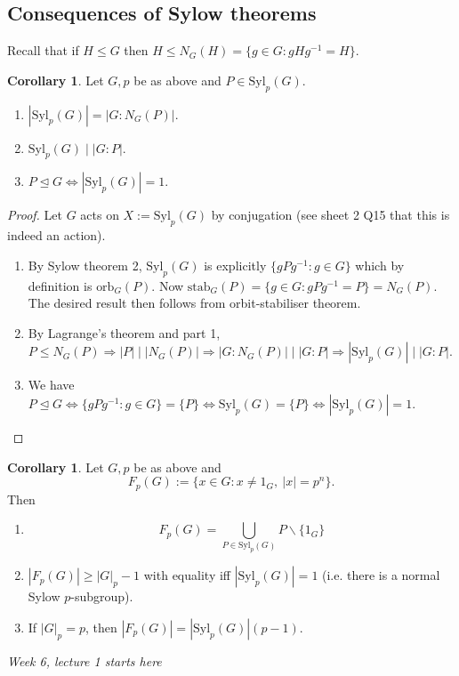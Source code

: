 \documentclass[a4paper]{article}
\newcommand{\Syl}{\text{Syl}}
\newcommand{\orb}{\text{orb}}
\newcommand{\stab}{\text{stab}}
\theoremstyle{definition}
\newtheorem{coro}[defn]{Corollary}
\begin{document}
\subsection{Consequences of Sylow theorems}
Recall that if $H\leq G$ then $H\leq N_G(H)=\{g\in G:gHg^{-1}=H\}$.

\begin{coro}
\label{coro:consequence1Sylow}
Let $G,p$ be as above and $P\in \Syl_p(G)$.
\begin{enumerate}
\item $|\Syl_p(G)|=|G:N_G(P)|$.
\item $\Syl_p(G)\mid |G:P|$.
\item $P\unlhd G\Leftrightarrow |\Syl_p(G)|=1$.
\end{enumerate}
\end{coro}
\begin{proof}
Let $G$ acts on $X:=\Syl_p(G)$ by conjugation (see sheet 2 Q15 that this is indeed an action).
\begin{enumerate}
\item By Sylow theorem 2, $\Syl_p(G)$ is explicitly $\{gPg^{-1}:g\in G\}$ which by definition is $\orb_G(P)$. Now $\stab_G(P)=\{g\in G:gPg^{-1}=P\}=N_G(P)$. The desired result then follows from orbit-stabiliser theorem.
\item By Lagrange's theorem and part 1, $P\leq N_G(P)\Rightarrow |P| \mid |N_G(P)| \Rightarrow |G:N_G(P)| \mid |G:P|\Rightarrow |\Syl_p(G)| \mid |G:P|$.
\item We have $P\unlhd G\Leftrightarrow \{gPg^{-1}:g\in G\}=\{P\}\Leftrightarrow \Syl_p(G)=\{P\}\Leftrightarrow |\Syl_p(G)|=1$.
\end{enumerate}
\end{proof}

\begin{coro}
\label{coro:consequence2Sylow}
Let $G,p$ be as above and
\[
F_p(G):=\{x\in G:x\neq 1_G,\ |x|=p^n\}.
\]
Then
\begin{enumerate}
\item \[
F_p(G)=\bigcup_{P\in\Syl_p(G)} P\backslash \{1_G\}
\]
\item $|F_p(G)|\geq |G|_p-1$ with equality iff $|\Syl_p(G)|=1$ (i.e. there is a normal Sylow $p$-subgroup).
\item If $|G|_p=p$, then $|F_p(G)|=|\Syl_p(G)|(p-1)$.
\end{enumerate}
\end{coro}

\begin{flushright}
\textit{Week 6, lecture 1 starts here}
\end{flushright}
\end{document}
